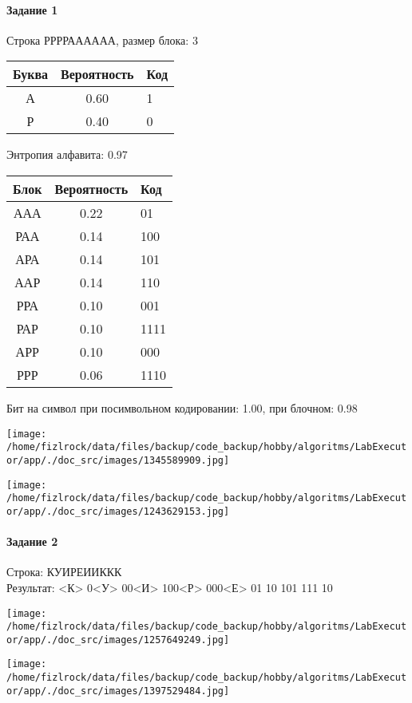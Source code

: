 \documentclass[a4paper, 12pt]{article}
\begin{document}
\paragraph{Задание 1}

Строка РРРРАААААА, размер блока: 3
\begin{center}
 \begin{tabular}{ |c|c|l| } 
  \hline
     Буква & Вероятность & Код\\ \hline
А & 0.60 & 1\\\hline
Р & 0.40 & 0
\\ \hline \end{tabular}
\end{center}
Энтропия алфавита: 0.97
\begin{center}
 \begin{tabular}{ |c|c|l| } 
  \hline
     Блок & Вероятность & Код\\ \hline
ААА & 0.22 & 01\\\hline
РАА & 0.14 & 100\\\hline
АРА & 0.14 & 101\\\hline
ААР & 0.14 & 110\\\hline
РРА & 0.10 & 001\\\hline
РАР & 0.10 & 1111\\\hline
АРР & 0.10 & 000\\\hline
РРР & 0.06 & 1110
\\ \hline \end{tabular}
\end{center}
Бит на символ при посимвольном кодировании: 1.00, при блочном: 0.98

\texttt{[image: /home/fizlrock/data/files/backup/code\_backup/hobby/algoritms/LabExecutor/app/./doc\_src/images/1345589909.jpg]}

\texttt{[image: /home/fizlrock/data/files/backup/code\_backup/hobby/algoritms/LabExecutor/app/./doc\_src/images/1243629153.jpg]}
\pagebreak
\paragraph{Задание 2}

Строка: 
КУИРЕИИККК\\
Результат: <К> 0<У> 00<И> 100<Р> 000<Е> 01 10 101 111 10

\texttt{[image: /home/fizlrock/data/files/backup/code\_backup/hobby/algoritms/LabExecutor/app/./doc\_src/images/1257649249.jpg]}

\texttt{[image: /home/fizlrock/data/files/backup/code\_backup/hobby/algoritms/LabExecutor/app/./doc\_src/images/1397529484.jpg]}
\end{document}
